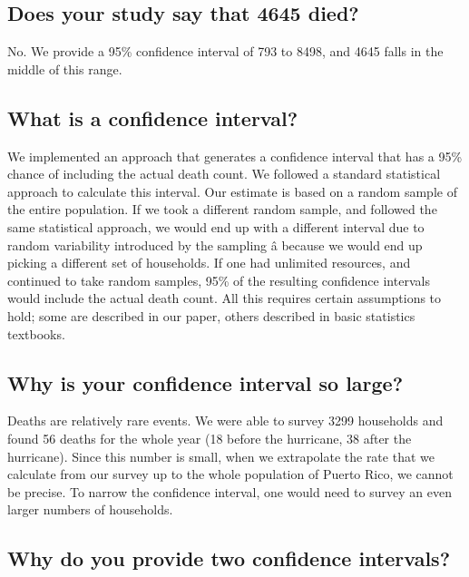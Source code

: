 \documentclass[]{article}
\begin{document}
\subsection{Does your study say that 4645
died?}\label{does-your-study-say-that-4645-died}

No. We provide a 95\% confidence interval of 793 to 8498, and 4645 falls
in the middle of this range.

\subsection{What is a confidence
interval?}\label{what-is-a-confidence-interval}

We implemented an approach that generates a confidence interval that has
a 95\% chance of including the actual death count. We followed a
standard statistical approach to calculate this interval. Our estimate
is based on a random sample of the entire population. If we took a
different random sample, and followed the same statistical approach, we
would end up with a different interval due to random variability
introduced by the sampling â because we would end up picking a
different set of households. If one had unlimited resources, and
continued to take random samples, 95\% of the resulting confidence
intervals would include the actual death count. All this requires
certain assumptions to hold; some are described in our paper, others
described in basic statistics textbooks.

\subsection{Why is your confidence interval so
large?}\label{why-is-your-confidence-interval-so-large}

Deaths are relatively rare events. We were able to survey 3299
households and found 56 deaths for the whole year (18 before the
hurricane, 38 after the hurricane). Since this number is small, when we
extrapolate the rate that we calculate from our survey up to the whole
population of Puerto Rico, we cannot be precise. To narrow the
confidence interval, one would need to survey an even larger numbers of
households.

\subsection{Why do you provide two confidence
intervals?}\label{why-do-you-provide-two-confidence-intervals}
\end{document}
